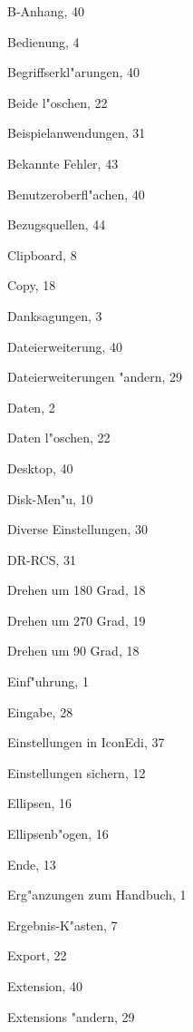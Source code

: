 \begin{theindex}
  \indexspace

  \item B-Anhang, 40
  \item Bedienung, 4
  \item Begriffserkl"arungen, 40
  \item Beide l"oschen, 22
  \item Beispielanwendungen, 31
  \item Bekannte Fehler, 43
  \item Benutzeroberfl"achen, 40
  \item Bezugsquellen, 44

  \indexspace

  \item Clipboard, 8
  \item Copy, 18

  \indexspace

  \item Danksagungen, 3
  \item Dateierweiterung, 40
  \item Dateierweiterungen "andern, 29
  \item Daten, 2
  \item Daten l"oschen, 22
  \item Desktop, 40
  \item Disk-Men"u, 10
  \item Diverse Einstellungen, 30
  \item DR-RCS, 31
  \item Drehen um 180 Grad, 18
  \item Drehen um 270 Grad, 19
  \item Drehen um 90 Grad, 18

  \indexspace

  \item Einf"uhrung, 1
  \item Eingabe, 28
  \item Einstellungen in IconEdi, 37
  \item Einstellungen sichern, 12
  \item Ellipsen, 16
  \item Ellipsenb"ogen, 16
  \item Ende, 13
  \item Erg"anzungen zum Handbuch, 1
  \item Ergebnis-K"asten, 7
  \item Export, 22
  \item Extension, 40
  \item Extensions "andern, 29


\end{theindex}

